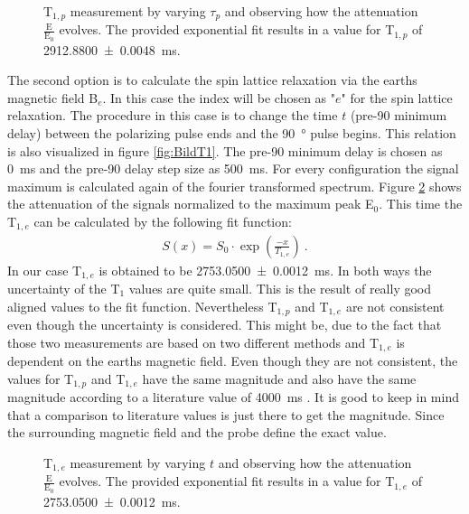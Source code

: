 \begin{figure}[H]
    \centering
    
    \caption[T$_{1,p}$ measurement by varying $\tau_p$ and observing how the attenuation $\frac{\text{E}}{\text{E}_0}$ evolves.]{T$_{1,p}$ measurement by varying $\tau_p$ and observing how the attenuation $\frac{\text{E}}{\text{E}_0}$ evolves.
    The provided exponential fit results in a value for T$_{1,p}$ of \SI{2912.8800 \pm 0.0048}{\milli \second}.}
    \label{fig:T1Polarisationsfeldfeld}
\end{figure}

The second option is to calculate the spin lattice relaxation via the earths magnetic field B$_e$.
In this case the index will be chosen as "$e$" for the spin lattice relaxation.
The procedure in this case is to change the time $t$ (pre-90 minimum delay) between the polarizing pulse ends and the \SI{90}{\degree} pulse begins.
This relation is also visualized in figure \ref{fig:BildT1}.
The pre-90 minimum delay is chosen as \SI{0}{\milli \second} and the pre-90 delay step size as \SI{500}{\milli \second}.
For every configuration the signal maximum is calculated again of the fourier transformed spectrum.
Figure \ref{fig:T1Erdmagnetfeld} shows the attenuation of the signals normalized to the maximum peak E$_0$.
This time the T$_{1,e}$ can be calculated by the following fit function:
\begin{align}
    S(x) = S_0 \cdot \exp\left(\frac{-x}{T_{1,e}}\right) \ .
    \label{eq: fitBe}
\end{align}
In our case T$_{1,e}$ is obtained to be \SI{2753.0500 \pm 0.0012}{\milli \second}.\newline
In both ways the uncertainty of the T$_1$ values are quite small.
This is the result of really good aligned values to the fit function.
Nevertheless T$_{1,p}$ and T$_{1,e}$ are not consistent even though the uncertainty is considered.
This might be, due to the fact that those two measurements are based on two different methods and T$_{1,e}$ is dependent on the earths magnetic field.
Even though they are not consistent, the values for T$_{1,p}$ and T$_{1,e}$ have the same magnitude and also have the same magnitude according to a literature value of \SI{4000}{\milli \second} \cite{literaturT1}.
It is good to keep in mind that a comparison to literature values is just there to get the magnitude.
Since the surrounding magnetic field and the probe define the exact value.
\begin{figure}[H]
    \centering
    
    \caption[T$_{1,e}$ measurement by varying $t$ and observing how the attenuation $\frac{\text{E}}{\text{E}_0}$ evolves.]{T$_{1,e}$ measurement by varying $t$ and observing how the attenuation $\frac{\text{E}}{\text{E}_0}$ evolves.
    The provided exponential fit results in a value for T$_{1,e}$ of \SI{2753.0500 \pm 0.0012}{\milli \second}.}
    \label{fig:T1Erdmagnetfeld}
\end{figure}